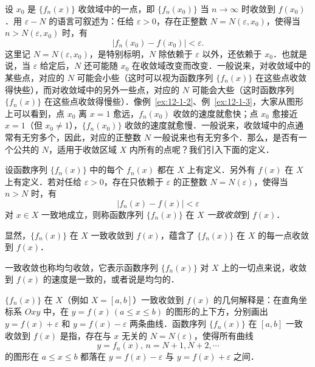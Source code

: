 设 $x_{0}$ 是 $\{f_{n}(x)\}$ 收敛域中的一点，即 $\{f_{n}(x_{0})\}$ 当 $n\to\infty$ 时收敛到 $f(x_{0})$．用 $\varepsilon-N$ 的语言可叙述为：任给 $\varepsilon>0$，存在正整数 $N=N(\varepsilon,x_{0})$，使得当 $n>N(\varepsilon,x_{0})$ 时，有
\[
\left|f_{n}(x_{0})-f(x_{0})\right|<\varepsilon.
\]
这里记 $N=N(\varepsilon,x_{0})$，是特别标明，$N$ 除依赖于 $\varepsilon$ 以外，还依赖于 $x_{0}$．也就是说，当 $\varepsilon$ 给定后，$N$ 还可能随 $x_{0}$ 在收敛域改变而改变．一般说来，对收敛域中的某些点，对应的 $N$ 可能会小些（这时可以视为函数序列 $\{f_{n}(x)\}$ 在这些点收敛得快些），而对收敛域中的另外一些点，对应的 $N$ 可能会大些（这时函数序列 $\{f_{n}(x)\}$ 在这些点收敛得慢些）．像例~\ref{ex:12-1-2}、例~\ref{ex:12-1-3}，大家从图形上可以看到，点 $x_{0}$ 离 $x=1$ 愈远，$f_{n}(x_{0})$ 收敛的速度就愈快；点 $x_{0}$ 愈接近 $x=1$（但 $x_{0}\neq 1$），$\{f_{n}(x_{0})\}$ 收敛的速度就愈慢．一般说来，收敛域中的点通常有无穷多个，因此，对应的正整数 $N$ 一般说来也有无穷多个．那么，是否有一个公共的 $N$，适用于收敛区域 $X$ 内所有的点呢？我们引入下面的定义．

\begin{definition}\label{def:12-1}
设函数序列 $\{f_{n}(x)\}$ 中的每个 $f_{n}(x)$ 都在 $X$ 上有定义．另外有 $f(x)$ 在 $X$ 上有定义．若对任给 $\varepsilon>0$，存在只依赖于 $\varepsilon$ 的正整数 $N=N(\varepsilon)$，使得当 $n>N$ 时，有
\[
\left|f_{n}(x)-f(x)\right|<\varepsilon
\]
对 $x\in X$ 一致地成立，则称函数序列 $\{f_{n}(x)\}$ 在 $X$ \emph{一致收敛}到 $f(x)$．
\end{definition}

显然，$\{f_{n}(x)\}$ 在 $X$ 一致收敛到 $f(x)$，蕴含了 $\{f_{n}(x)\}$ 在 $X$ 的每一点收敛到 $f(x)$．

一致收敛也称均匀收敛，它表示函数序列 $\{f_{n}(x)\}$ 对 $X$ 上的一切点来说，收敛到 $f(x)$ 的速度是一致的，或者说是均匀的．

$\{f_{n}(x)\}$ 在 $X$（例如 $X=[a,b]$）一致收敛到 $f(x)$ 的几何解释是：在直角坐标系 $Oxy$ 中，在 $y=f(x)\,(a\leqslant x\leqslant b)$ 的图形的上下方，分别画出 $y=f(x)+\varepsilon$ 和 $y=f(x)-\varepsilon$ 两条曲线．函数序列 $\{f_{n}(x)\}$ 在 $[a,b]$ 一致收敛到 $f(x)$ 是指，存在与 $x$ 无关的 $N=N(\varepsilon)$，使得所有曲线
\[
y=f_{n}(x),\,n=N+1,N+2,\cdots
\]
的图形在 $a\leqslant x\leqslant b$ 都落在 $y=f(x)-\varepsilon$ 与 $y=f(x)+\varepsilon$ 之间．

